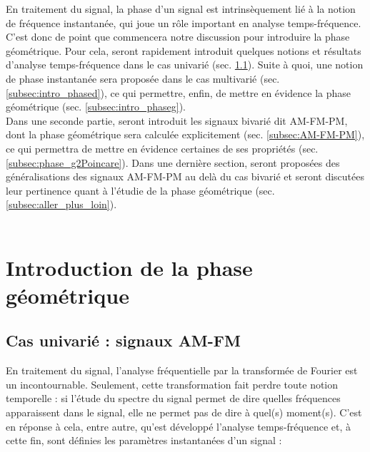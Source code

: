 
En traitement du signal, la phase d'un signal est intrinsèquement lié à la notion de fréquence instantanée, qui joue un rôle important en analyse temps-fréquence. 
C'est donc de point que commencera notre discussion pour introduire la phase géométrique.
Pour cela, seront rapidement introduit quelques notions et résultats d'analyse temps-fréquence dans le cas univarié (sec. \ref{subsec:ana_temp-freq}). Suite à quoi, une notion de phase instantanée sera proposée dans le cas multivarié (sec. \ref{subsec:intro_phased}), ce qui permettre, enfin, de mettre en évidence la phase géométrique (sec. \ref{subsec:intro_phaseg}).
\\

Dans une seconde partie, seront introduit les signaux bivarié dit AM-FM-PM, dont la phase géométrique sera calculée explicitement (sec. \ref{subsec:AM-FM-PM}), ce qui permettra de mettre en évidence certaines de ses propriétés (sec. \ref{subsec:phase_g2Poincare}). Dans une dernière section, seront proposées des généralisations des signaux AM-FM-PM au delà du cas bivarié et seront discutées leur pertinence quant à l'étudie de la phase géométrique (sec. \ref{subsec:aller_plus_loin}).
\\ 

\\




\section{Introduction de la phase géométrique} \label{sec:intro_phaseg}

\subsection{Cas univarié : signaux AM-FM} \label{subsec:ana_temp-freq}


En traitement du signal, l'analyse fréquentielle par la transformée de Fourier est un incontournable. 
Seulement, cette transformation fait perdre toute notion temporelle : si l'étude du spectre du signal permet de dire quelles fréquences apparaissent dans le signal, elle ne permet pas de dire à quel(s) moment(s). 
C'est en réponse à cela, entre autre, qu'est développé l'analyse temps-fréquence et, à cette fin, sont définies les paramètres instantanées d'un signal :\par

